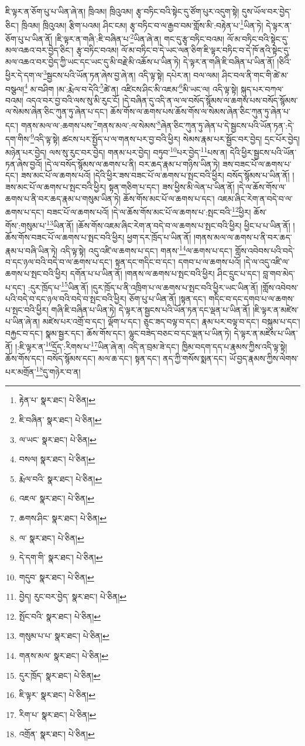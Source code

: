 ཇི་ལྟར་ན་ཅོག་པུ་པ་ཡིན་ཞེ་ན། ཁྲིའམ། ཁྲིའུའམ། རྩྭ་བཏིང་བའི་སྟེང་དུ་ཙོག་པུར་འདུག་སྟེ། དུས་ཡོལ་བར་བྱེད་ཅིང་། ཁྲིའམ། ཁྲིའུའམ། རྩིག་པའམ། ཤིང་ངམ། རྩྭ་བཏིང་བ་ལ་རྒྱབ་བམ་གློས་མི་:བརྟེན་པ་\footnote{རྟེན་པ་  སྣར་ཐང་།  པེ་ཅིན། }ཡིན་ཏེ། དེ་ལྟར་ན་ཅོག་པུ་པ་ཡིན་ནོ། །ཇི་ལྟར་ན་གཞི་:ཇི་བཞིན་པ་\footnote{ཇི་བཞིན་  སྣར་ཐང་།  པེ་ཅིན། }ཡིན་ཞེ་ན། གང་དུ་རྩྭ་བཏིང་བའམ། ལོ་མ་བཏིང་བའི་སྟེང་དུ་མལ་འཆའ་བར་བྱེད་ཅིང་། རྩྭ་བཏིང་བའམ། ལོ་མ་བཏིང་བ་དེ་ཡང་ལན་ཅིག་ཇི་ལྟར་བཏིང་བ་དེ་ཁོ་ནའི་སྟེང་དུ་མལ་འཆའ་བར་བྱེད་ཀྱི་ཡང་དང་ཡང་དུ་མི་བརྗེ་མི་འཆོས་པ་ཡིན་ཏེ། དེ་ལྟར་ན་གཞི་ཇི་བཞིན་པ་ཡིན་ནོ། །ཅིའི་ཕྱིར་དེ་དག་ལ་\footnote{ལ་ཡང་  སྣར་ཐང་།  པེ་ཅིན། }སྦྱངས་པའི་ཡོན་ཏན་ཞེས་བྱ་ཞེ་ན། འདི་ལྟ་སྟེ། དཔེར་ན། བལ་ལམ། ཤིང་བལ་ནི་གང་གི་ཚེ་མ་བསྩལ།\footnote{བསལ།  སྣར་ཐང་།  པེ་ཅིན། } མ་བཤིག །མ་:རྨེལ་བ་དེའི་\footnote{རྨེལ་བའི་  སྣར་ཐང་།  པེ་ཅིན། }ཚེ་ན། འཛིངས་ཤིང་མི་འཇམ་\footnote{འཇལ་  སྣར་ཐང་།  པེ་ཅིན། }མི་ཡང་ལ། འདི་ལྟ་སྟེ། སྐུད་པར་བཀལ་བའམ། འདའ་བར་བྱ་བའི་ལས་སུ་མི་རུང་ངོ། །དེ་བཞིན་དུ་འདི་ན་ལ་ལ་བསོད་སྙོམས་ལ་ཆགས་པས་བསོད་སྙོམས་ལ་སེམས་ཞེན་ཅིང་ཀུན་ཏུ་ཞེན་པ་དང་། ཆོས་གོས་ལ་ཆགས་པས་ཆོས་གོས་ལ་སེམས་ཞེན་ཅིང་ཀུན་ཏུ་ཞེན་པ་དང་། གནས་མལ་ལ་:ཆགས་པས་\footnote{ཆགས་ཤིང་  སྣར་ཐང་།  པེ་ཅིན། }གནས་མལ་:ལ་སེམས་\footnote{ལ་  སྣར་ཐང་།  པེ་ཅིན། }ཞེན་ཅིང་ཀུན་ཏུ་ཞེན་པ་དེ་སྦྱངས་པའི་ཡོན་ཏན་:དེ་དག་གིས་\footnote{དེ་དག་གི་  སྣར་ཐང་།  པེ་ཅིན། }འདི་ལྟ་སྟེ། ཚངས་པར་སྤྱོད་པ་ལ་གནས་པར་བྱ་བའི་ཕྱིར། སེམས་རྣམ་པར་སྦྱོང་བར་བྱེད། དྲང་པོར་བྱེད། མཉེན་པར་བྱེད། ལས་སུ་རུང་བར་བྱེད། གནམ་པར་བྱེད། བཏུབ་\footnote{གདུབ་  སྣར་ཐང་།  པེ་ཅིན། }པར་བྱེད་\footnote{བྱེད། རུང་བར་བྱེད་  སྣར་ཐང་།  པེ་ཅིན། }པས་ན། དེའི་ཕྱིར་སྦྱངས་པའི་ཡོན་ཏན་ཞེས་བྱའོ། །དེ་ལ་བསོད་སྙོམས་ལ་ཆགས་པ་ནི། བར་ཆད་རྣམ་པ་གཉིས་ཡིན་ཏེ། ཟས་བཟང་པོ་ལ་ཆགས་པ་དང་། ཟས་མང་པོ་ལ་ཆགས་པའོ། །དེའི་ཕྱིར་ཟས་བཟང་པོ་ལ་ཆགས་པ་སྤང་བའི་ཕྱིར། བསོད་སྙོམས་པ་ཡིན་ནོ། །ཟས་མང་པོ་ལ་ཆགས་པ་སྤང་བའི་ཕྱིར། སྟན་གཅིག་པ་དང་། ཟས་ཕྱིས་མི་ལེན་པ་ཡིན་ནོ། །དེ་ལ་ཆོས་གོས་ལ་ཆགས་པ་ནི་བར་ཆད་རྣམ་པ་གསུམ་ཡིན་ཏེ། ཆོས་གོས་མང་པོ་ལ་ཆགས་པ་དང་། འཇམ་ཞིང་རེག་ན་བདེ་བ་ལ་ཆགས་པ་དང་། བཟང་པོ་ལ་ཆགས་པའོ། །དེ་ལ་ཆོས་གོས་མང་པོ་ལ་ཆགས་པ་:སྤང་བའི་\footnote{སྤོང་བའི་  སྣར་ཐང་།  པེ་ཅིན། }ཕྱིར། ཆོས་གོས་:གསུམ་པ་\footnote{གསུམ་པ་པ་  སྣར་ཐང་།  པེ་ཅིན། }ཡིན་ནོ། །ཆོས་གོས་འཇམ་ཞིང་རེག་ན་བདེ་བ་ལ་ཆགས་པ་སྤང་བའི་ཕྱིར། ཕྱིང་པ་པ་ཡིན་ནོ། །ཆོས་གོས་བཟང་པོ་ལ་ཆགས་པ་སྤང་བའི་ཕྱིར། ཕྱག་དར་ཁྲོད་པ་ཡིན་ནོ། །གནས་མལ་ལ་ཆགས་པ་ནི་བར་ཆད་རྣམ་པ་བཞི་ཡིན་ཏེ། འདི་ལྟ་སྟེ། འདུ་འཛི་ལ་ཆགས་པ་དང་། གནས་\footnote{གནས་མལ་  སྣར་ཐང་།  པེ་ཅིན། }ལ་ཆགས་པ་དང་། གློས་འབེབས་པའི་བདེ་བ་དང་ཉལ་བའི་བདེ་བ་ལ་ཆགས་པ་དང་། སྟན་དང་གདིང་བ་དང་། དགབ་པ་ལ་ཆགས་པའོ། །དེ་ལ་འདུ་འཛི་ལ་ཆགས་པ་སྤང་བའི་ཕྱིར། དགོན་པ་པ་ཡིན་ནོ། །གནས་ལ་ཆགས་པ་སྤང་བའི་ཕྱིར། ཤིང་དྲུང་པ་དང་། བླ་གབ་མེད་པ་དང་། :དུར་ཁྲོད་པ་\footnote{དུར་ཁྲོད་  སྣར་ཐང་།  པེ་ཅིན། }ཡིན་ནོ། །དུར་ཁྲོད་པ་ནི་འཁྲིག་པ་ལ་ཆགས་པ་སྤང་བའི་ཕྱིར་ཡང་ཡིན་ནོ། །གློས་འབེབས་པའི་བདེ་བ་དང་ཉལ་བའི་བདེ་བ་སྤང་བའི་ཕྱིར། ཅོག་པུ་པ་ཡིན་ནོ། །སྟན་དང་། གདིང་བ་དང་དགབ་པ་ལ་ཆགས་པ་སྤང་བའི་ཕྱིར། གཞི་ཇི་བཞིན་པ་ཡིན་ཏེ། དེ་ལྟར་ན་སྦྱངས་པའི་ཡོན་ཏན་དང་ལྡན་པ་ཡིན་ནོ། །ཇི་ལྟར་ན་མཛེས་པ་ཡིན་ཞེ་ན། མཛེས་པར་འགྲོ་བ་དང་། ལྡོག་པ་དང་། ཅུང་ཟད་བལྟ་བ་དང་། རྣམ་པར་བལྟ་བ་དང་། བསྐུམ་པ་དང་། བརྐྱང་བ་དང་། སྣམ་སྦྱར་དང་། ཆོས་གོས་དང་། ལྷུང་བཟེད་བཅང་བ་དང་ལྡན་པ་ཡིན་ཏེ། དེ་ལྟར་ན་མཛེས་པ་ཡིན་ནོ། །:ཇི་ལྟར་ན་\footnote{ཇི་ལྟར་  སྣར་ཐང་།  པེ་ཅིན། }དྲོད་:རིགས་པ་\footnote{རིག་པ་  སྣར་ཐང་།  པེ་ཅིན། }ཡིན་ཞེ་ན། འདི་ན་བྲམ་ཟེ་དང་། ཁྱིམ་བདག་དད་པ་རྣམས་ཀྱིས་འདི་ལྟ་སྟེ། ཆོས་གོས་དང་། བསོད་སྙོམས་དང་། མལ་ཆ་དང་། སྟན་དང་། ནད་ཀྱི་གསོས་སྨན་དང་། ཡོ་བྱད་རྣམས་ཀྱིས་ལེགས་པར་མགྲོན་\footnote{འགྲོན་  སྣར་ཐང་།  པེ་ཅིན། }དུ་གཉེར་བ་ན། 